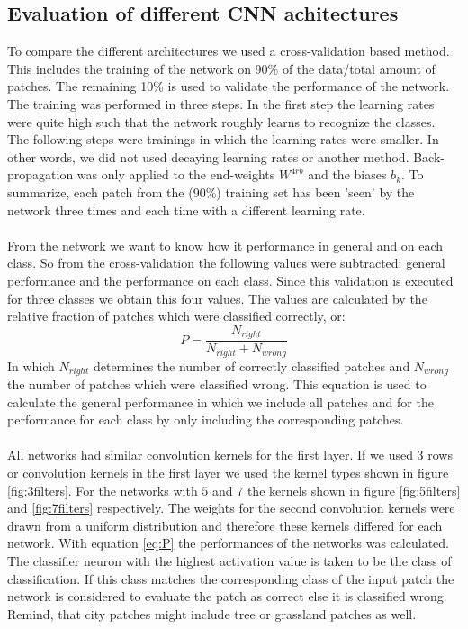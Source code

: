 \documentclass[a4paper,onecolumn]{report}
\begin{document}
\begin{appendices}
	
\chapter{Evaluation of different CNN achitectures}
\label{app:DiffentArchitectures}
To compare the different architectures we used a cross-validation based method. This includes the training of the network on 90\% of the data/total amount of patches. The remaining 10\% is used to validate the performance of the network. The training was performed in three steps. In the first step the learning rates were quite high such that the network roughly learns to recognize the classes. The following steps were trainings in which the learning rates were smaller. In other words, we did not used decaying learning rates or another method. Back-propagation  was only applied to the end-weights $W^{4rb}$ and the biases $b_{k}$. To summarize, each patch from the (90\%) training set  has been 'seen' by the network three times and each time with a different learning rate. 
\\\\
From the network we want to know how it performance in general and on each class. So from the cross-validation the following values were subtracted: general performance and the performance on each class. Since this validation is executed for three classes we obtain this four values. The values are calculated by the relative fraction of patches which were classified correctly, or:
\begin{equation}
\label{eq:P}
P= \frac{N_{right}}{N_{right}+ N_{wrong}}
\end{equation}
In which $N_{right}$ determines the number of correctly classified patches and $N_{wrong}$ the number of patches which were classified wrong. This equation is used to calculate the general performance in which we include all patches and for the performance for each class by only including the corresponding patches.
\\\\
All networks had similar convolution kernels for the first layer. If we used $3$ rows or convolution kernels in the first layer we used the kernel types shown in figure \ref{fig:3filters}. For the networks with $5$ and $7$ the kernels shown in figure \ref{fig:5filters} and \ref{fig:7filters} respectively. The weights for the second convolution kernels were drawn from a uniform distribution and therefore these kernels differed for each network. With equation \ref{eq:P} the performances of the networks was calculated. The classifier neuron with the highest activation value is taken to be the class of classification. If this class matches the corresponding class of the input patch the network is considered to evaluate the patch as correct else it is classified wrong. Remind, that city patches might include tree or grassland patches as well.


\end{appendices}
\end{document}
